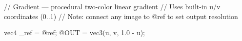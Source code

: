 // Gradient — procedural two-color linear gradient
// Uses built-in u/v coordinates (0..1)
// Note: connect any image to @ref to set output resolution

vec4 _ref = @ref;
@OUT = vec3(u, v, 1.0 - u);
